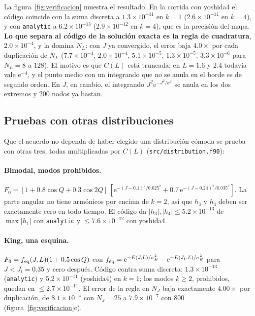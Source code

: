 \documentclass[11pt,a4paper]{article}
\newcommand{\ee}{\mathrm{e}}
\begin{document}
La figura~\ref{fig:verificacion} muestra el resultado. En la corrida con yoshida4 el
código coincide con la suma discreta a $1.3\times10^{-11}$ en $k=1$ ($2.6\times10^{-11}$
en $k=4$), y con \texttt{analytic} a $6.2\times10^{-13}$ ($2.9\times10^{-12}$ en $k=4$), que
es la precisión del mapa. \textbf{Lo que separa al código de la solución exacta es la
regla de cuadratura}, $2.0\times10^{-4}$, y la domina $N_L$: con $J$ ya convergido, el
error baja $4.0\times$ por cada duplicación de $N_L$ ($7.7\times10^{-4}$, $2.0\times10^{-4}$,
$5.1\times10^{-5}$, $1.3\times10^{-5}$, $3.3\times10^{-6}$ para $N_L=8$ a $128$). El
motivo es que $C(L)$ está truncada: en $L=1.6$ y $2.4$ todavía vale $\ee^{-4}$, y el punto
medio con un integrando que no se anula en el borde es de segundo orden. En $J$, en
cambio, el integrando $J^2\ee^{-J^2/\sigma^2}$ se anula en los dos extremos y 200 nodos ya
bastan.

\subsection{Pruebas con otras distribuciones}

Que el acuerdo no dependa de haber elegido una distribución cómoda se prueba con otras
tres, todas multiplicadas por $C(L)$ (\texttt{src/distribution.f90}):

\paragraph{Bimodal, modos prohibidos.}
$F_0=[1+0.8\cos Q+0.3\cos2Q]\,[\ee^{-(J-0.1)^2/0.025^2}+0.7\,\ee^{-(J-0.24)^2/0.035^2}]$.
La parte angular no tiene armónicos por encima de $k=2$, así que $h_3$ y $h_4$ deben ser
exactamente cero en todo tiempo. El código da $|h_3|,|h_4|\leq5.2\times10^{-13}$ de
$\max|h_1|$ con \texttt{analytic} y $\leq7.6\times10^{-12}$ con yoshida4.

\paragraph{King, una esquina.} $F_0=f_{\rm eq}(J,L)(1+0.5\cos Q)$ con
$f_{\rm eq}=\ee^{-E(J,L)/\sigma_E^2}-\ee^{-E(J_t,L)/\sigma_E^2}$ para $J<J_t=0.35$ y cero
después. Código contra suma discreta: $1.3\times10^{-13}$ (\texttt{analytic}) y
$5.2\times10^{-11}$ (yoshida4) en $k=1$; los modos $k\ge2$, prohibidos, quedan en
$\leq2.7\times10^{-11}$. El error de la regla en $N_J$ baja exactamente $4.00\times$ por
duplicación, de $8.1\times10^{-4}$ con $N_J=25$ a $7.9\times10^{-7}$ con $800$
(figura~\ref{fig:verificacion}c).
\end{document}
